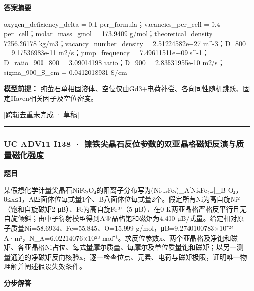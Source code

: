 \documentclass[UTF8,11pt,a4paper]{ctexart}
\begin{document}
\noindent\textbf{答案摘要}\par
oxygen\_deficiency\_delta = 0.1 per\_formula；vacancies\_per\_cell = 0.4 per\_cell；molar\_mass\_gmol = 173.9409 g/mol；theoretical\_density = 7256.26178 kg/m3；vacancy\_number\_density = 2.51224582e+27 m\textasciicircum{}-3；D\_800 = 9.17536983e-11 m2/s；jump\_frequency = 7.49611511e+09 s\textasciicircum{}-1；D\_ratio\_900\_800 = 3.09014198 ratio；D\_900 = 2.83531955e-10 m2/s；sigma\_900\_S\_cm = 0.0412018931 S/cm\par
\noindent\textbf{模型前提：}
纯萤石单相固溶体、空位仅由Gd3+电荷补偿、各向同性随机跳跃、固定Haven相关因子及空位密度。\par
\noindent\textcolor{red!65!black}{[跨辑去重未完成 · 草稿]} \par
\medskip\hrule\medskip
{}
\subsubsection*{UC-ADV11-I138 · 镍铁尖晶石反位参数的双亚晶格磁矩反演与质量磁化强度}
\noindent\textbf{题目}\par
某假想化学计量尖晶石NiFe₂O₄的阳离子分布写为(Ni₁₋ₓFeₓ)\_A[NiₓFe₂₋ₓ]\_B O₄，0≤x≤1，A四面体位每式量1个、B八面体位每式量2个。假定所有Ni为高自旋Ni²⁺（饱和自旋磁矩2 μB）、Fe为高自旋Fe³⁺（5 μB），在0 K两亚晶格严格反平行且无自旋倾斜；由中子衍射模型得到A亚晶格饱和磁矩为4.400 μB/式量。给定相对原子质量Ni=58.6934、Fe=55.845、O=15.999 g/mol，μB=9.2740100783×10⁻²⁴ A·m²，N\_A=6.02214076×10²³ mol⁻¹。求反位参数x、两个亚晶格及净饱和磁矩、各亚晶格Ni占位、每式量摩尔质量、每摩尔及单位质量饱和磁矩；以另一测量通道的净磁矩反向核验x，逐一检查位点、元素、电荷与磁矩极限，证明唯一物理解并阐述假设失效条件。\par
\medskip\noindent\textbf{分步解答}
\end{document}
